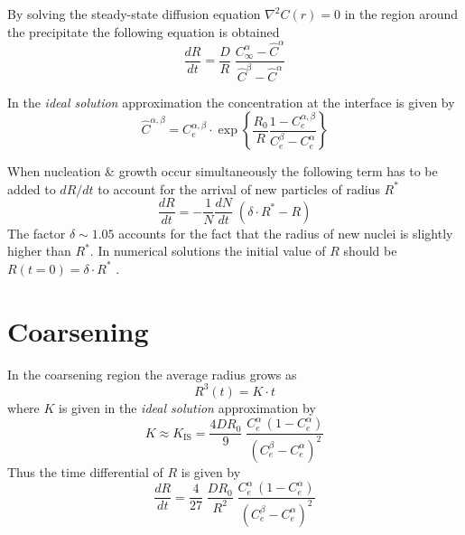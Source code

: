 \documentclass[12pt,a4paper]{article}
\begin{document}
By solving the steady-state diffusion equation $\nabla^2 C(r)=0$ in the region around the precipitate the following equation is obtained
\begin{equation}
\frac{dR}{dt} = \frac{D}{R} \; \frac{C_\infty^\alpha-\hat{C}^\alpha}{\hat{C}^\beta-\hat{C}^\alpha}
\end{equation}

In the \textit{ideal solution} approximation the concentration at the interface is given by
\begin{equation}
\hat{C}^{\alpha,\beta} = C_e^{\alpha,\beta} \cdot \exp \left\lbrace \frac{R_0}{R} \frac{1-C_e^{\alpha,\beta}}{C_e^\beta - C_e^\alpha}\right\rbrace 
\end{equation}

When nucleation \& growth occur simultaneously the following term has to be added to $dR/dt$ to account for the arrival of new particles of radius $R^*$
\begin{equation}
\frac{dR}{dt} = -\frac{1}{N} \frac{dN}{dt}\; (\delta \cdot R^* - R)
\end{equation}
The factor $\delta\sim 1.05$ accounts for the fact that the radius of new nuclei is slightly higher than $R^*$. In numerical solutions the initial value of $R$ should be $R(t=0) = \delta \cdot R^*$ .

\section{Coarsening}

In the coarsening region the average radius grows as
\begin{equation}
R^3(t) = K\cdot t
\end{equation}
where $K$ is given in the \textit{ideal solution} approximation by
\begin{equation}
K\approx K_{\text{IS}} = \frac{4D R_0}{9}\;\frac{C_e^\alpha\, (1-C_e^\alpha)}{(C_e^\beta - C_e^\alpha )^2}
\end{equation}
Thus the time differential of $R$ is given by
\begin{equation}
\frac{dR}{dt} = \frac{4}{27}\;\frac{D R_0}{R^2}\;\frac{C_e^\alpha\, (1-C_e^\alpha)}{(C_e^\beta - C_e^\alpha )^2}
\end{equation}


\end{document}
